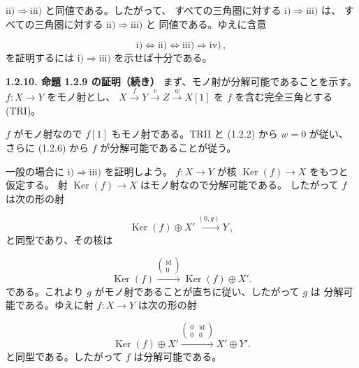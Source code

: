 \clearpage
{}%
\begingroup
\small
\setlength{\abovedisplayskip}{4pt plus 2pt minus 2pt}%
\setlength{\belowdisplayskip}{4pt plus 2pt minus 2pt}%

$\mathrm{ii)}\Longrightarrow\mathrm{iii)}$ と同値である。したがって、
すべての三角圏に対する $\mathrm{i)}\Longrightarrow\mathrm{iii)}$ は、
すべての三角圏に対する $\mathrm{ii)}\Longrightarrow\mathrm{iii)}$ と
同値である。ゆえに含意

\[
  \mathrm{i)}\Longleftrightarrow\mathrm{ii)}
  \Longleftrightarrow\mathrm{iii)}\Longrightarrow\mathrm{iv)}\,,
\]
を証明するには $\mathrm{i)}\Longrightarrow\mathrm{iii)}$ を示せば十分である。

\medskip
\noindent\textbf{1.2.10. 命題 1.2.9 の証明（続き）}\quad
まず、モノ射が分解可能であることを示す。
$f\colon X\longrightarrow Y$ をモノ射とし、
$X\xrightarrow{f}Y\xrightarrow{v}Z\xrightarrow{w}X[1]$
を $f$ を含む完全三角とする (TRI)。

$f$ がモノ射なので $f[1]$ もモノ射である。TRII と (1.2.2) から
$w=0$ が従い、さらに (1.2.6) から $f$ が分解可能であることが従う。

一般の場合に $\mathrm{i)}\Longrightarrow\mathrm{iii)}$ を証明しよう。
$f\colon X\longrightarrow Y$ が核
$\operatorname{Ker}(f)\longrightarrow X$ をもつと仮定する。
射 $\operatorname{Ker}(f)\longrightarrow X$ はモノ射なので分解可能である。
したがって $f$ は次の形の射

\[
  \operatorname{Ker}(f)\oplus X'
  \xrightarrow{(0,g)}Y\,,
\]
と同型であり、その核は

\[
  \operatorname{Ker}(f)
  \xrightarrow{\left(\begin{smallmatrix}\operatorname{id}\\0\end{smallmatrix}\right)}
  \operatorname{Ker}(f)\oplus X'.
\]
である。これより $g$ がモノ射であることが直ちに従い、したがって $g$ は
分解可能である。ゆえに射 $f\colon X\longrightarrow Y$ は次の形の射

\[
  \operatorname{Ker}(f)\oplus X'
  \xrightarrow{\left(\begin{smallmatrix}0&\operatorname{id}\\0&0\end{smallmatrix}\right)}
  X'\oplus Y'.
\]
と同型である。したがって $f$ は分解可能である。

